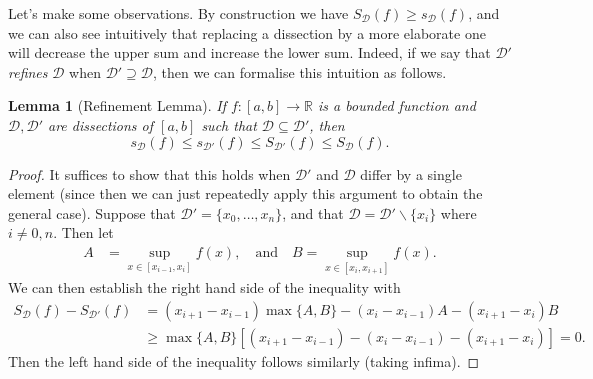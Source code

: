 \documentclass[11pt, a4paper]{article}
\newtheorem{lemma}[theorem]{Lemma}
\theoremstyle{definition}
\newcommand{\vocab}[1]{\emph{#1}} %
\newcommand{\R}{\mathbb{R}}
\newcommand{\DD}{\mathcal{D}}
\begin{document}
\begin{center}

\end{center}

Let's make some observations. By construction we have $S_\DD (f) \geq s_\DD(f)$, and we can also see intuitively that replacing a dissection by a more elaborate one will decrease the upper sum and increase the lower sum. Indeed, if we say that $\DD'$ \vocab{refines} $\DD$ when $\DD' \supseteq \DD$, then we can formalise this intuition as follows.

\begin{lemma}[Refinement Lemma]
	If $f: [a, b] \rightarrow \R$ is a bounded function and $\DD, \DD'$ are dissections of $[a, b]$ such that $\DD \subseteq \DD'$, then 
	$$s_\DD(f) \leq s_{\DD'}(f) \leq S_{\DD'}(f) \leq S_{\DD}(f).$$
\end{lemma}
\begin{proof}
	It suffices to show that this holds when $\DD'$ and $\DD$ differ by a single element (since then we can just repeatedly apply this argument to obtain the general case).
	Suppose that $\DD' = \{x_0, \dots, x_n\}$, and that $\DD = \DD' \backslash \{x_i\}$ where $i \neq 0, n$. Then let
	\begin{align*}
		A &= \sup_{x \in [x_{i - 1}, x_i]} f(x), \quad \text{and} \quad B = \sup_{x \in [x_{i}, x_{i+1}]} f(x).
	\end{align*}
	We can then establish the right hand side of the inequality with
	\begin{align*}
		S_{\DD}(f) - S_{\DD'}(f) &= (x_{i+1} - x_{i-1})\max\{A, B\} - (x_{i} - x_{i - 1})A - (x_{i + 1} - x_i)B \\
		&\geq \max\{A, B\}[(x_{i+1} - x_{i-1}) - (x_{i} - x_{i - 1}) - (x_{i + 1} - x_i)] = 0.
	\end{align*}
	Then the left hand side of the inequality follows similarly (taking infima).
\end{proof}
\end{document}
